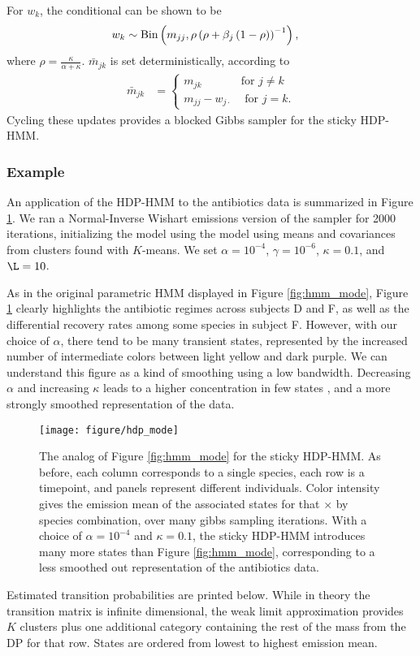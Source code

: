 \documentclass{article}
\begin{document}
For $w_k$, the conditional can be shown to be
\begin{align*}
  w_k &\sim \textnormal{Bin}\left(m_{jj}, \rho\left(\rho + \beta_j\left(1 - \rho\right)\right)^{-1}\right),
\end{align*}
where $\rho = \frac{\kappa}{\alpha + \kappa}$. $\bar{m}_{jk}$ is set
deterministically, according to
\begin{align*}
  \bar{m}_{jk} &= \begin{cases}
    m_{jk} &\text{for } j \neq k\\
    m_{jj} - w_{j \cdot} &\text{ for } j = k.
  \end{cases}
\end{align*}
Cycling these updates provides a blocked Gibbs sampler for the sticky HDP-HMM.

\subsubsection{Example}
\label{subsubsec:sticky_hdp_hmm_example}

An application of the HDP-HMM to the antibiotics data is summarized in Figure
\ref{fig:hdp_mode}. We ran a Normal-Inverse Wishart emissions version of the
sampler for 2000 iterations, initializing the model using the model using means
and covariances from clusters found with $K$-means. We set $\alpha = 10^{-4}$,
$\gamma = 10^{-6}$, $\kappa = 0.1$, and $\L = 10$.

As in the original parametric HMM displayed in Figure \ref{fig:hmm_mode}, Figure
\ref{fig:hdp_mode} clearly highlights the antibiotic regimes across subjects D
and F, as well as the differential recovery rates among some species in subject
F. However, with our choice of $\alpha$, there tend to be many transient states,
represented by the increased number of intermediate colors between light yellow
and dark purple. We can understand this figure as a kind of smoothing using a
low bandwidth. Decreasing $\alpha$ and increasing $\kappa$ leads to a higher
concentration in few states , and a more strongly smoothed representation of the
data.

\begin{figure}[ht]
  \centering
  \texttt{[image: figure/hdp\_mode]}
  \caption{
    The analog of Figure \ref{fig:hmm_mode} for the sticky HDP-HMM. As before,
    each column corresponds to a single species, each row is a timepoint, and
    panels represent different individuals. Color intensity gives the emission
    mean of the associated states for that $\times$ by species combination, over
    many gibbs sampling iterations. With a choice of $\alpha = 10^{-4}$ and
    $\kappa = 0.1$, the sticky HDP-HMM introduces many more states than Figure
    \ref{fig:hmm_mode}, corresponding to a less smoothed out representation of
    the antibiotics data. \label{fig:hdp_mode} }
\end{figure}
Estimated transition probabilities are printed below. While in theory the
transition matrix is infinite dimensional, the weak limit approximation provides
$K$ clusters plus one additional category containing the rest of the mass from
the DP for that row. States are ordered from lowest to highest emission mean.
\end{document}
